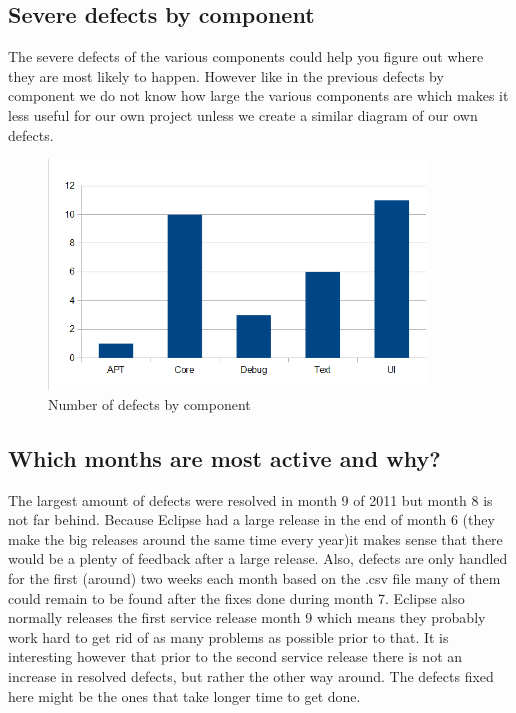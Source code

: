 \documentclass{article}
\begin{document}
\subsection{Severe defects by component}
The severe defects of the various components could help you figure out where they are most likely to happen.
However like in the previous defects by component we do not know how large the various components are which makes it less useful for our own project unless we create a similar diagram of our own defects.
\begin{figure}[H]
\center
\includegraphics[width=100mm]{severe_defects_per_component.png}
\caption{Number of defects by component}
\end{figure}

\subsection{Which months are most active and why?}
The largest amount of defects were resolved in month 9 of 2011 but month 8 is not far behind. 
Because Eclipse had a large release in the end of month 6 (they make the big releases around the same time every year)it makes sense that there would be a plenty of feedback after a large release.
Also, defects are only handled for the first (around) two weeks each month based on the .csv file many of them could remain to be found after the fixes done during month 7.
Eclipse also normally releases the first service release month 9 which means they probably work hard to get rid of as many problems as possible prior to that.
It is interesting however that prior to the second service release there is not an increase in resolved defects, but rather the other way around. The defects fixed here might be the ones that take longer time to get done.


\end{document}
